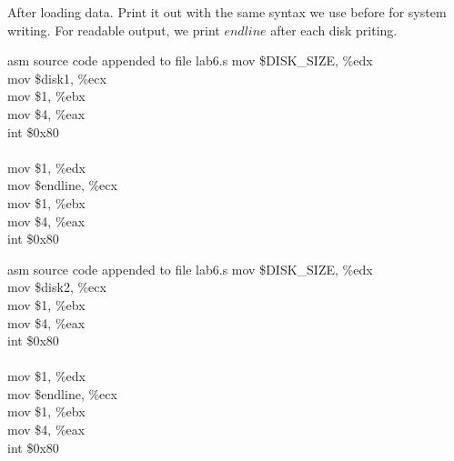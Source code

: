\documentclass{article}
\begin{document}
After loading data. Print it out with the same syntax we use before for system writing. For readable output, we print $endline$ after each disk priting.
\begin{multicols}{2}
\begin{GFT}{asm source code appended to file lab6.s}
\+mov \$DISK\_SIZE, \%edx\\
\+mov \$disk1, \%ecx\\
\+mov \$1, \%ebx\\
\+mov \$4, \%eax\\
\+int \$0x80\\
\+\\
\+mov \$1, \%edx\\
\+mov \$endline, \%ecx\\
\+mov \$1, \%ebx\\
\+mov \$4, \%eax\\
\+int \$0x80\\
\end{GFT}
\columnbreak
\begin{GFT}{asm source code appended to file lab6.s}
\+mov \$DISK\_SIZE, \%edx\\
\+mov \$disk2, \%ecx\\
\+mov \$1, \%ebx\\
\+mov \$4, \%eax\\
\+int \$0x80\\
\+\\
\+mov \$1, \%edx\\
\+mov \$endline, \%ecx\\
\+mov \$1, \%ebx\\
\+mov \$4, \%eax\\
\+int \$0x80\\
\end{GFT}
\end{multicols}
\clearpage
\end{document}
